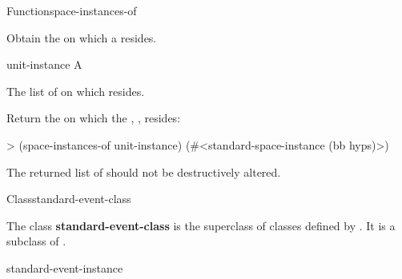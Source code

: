 \documentclass[10pt,twoside,english,pdftex]{article}
\begin{document}

\begin{functiondoc}{Function}{space-instances-of}%
  { \returns{} }
%
%

\fnsyntax

\fnpurpose Obtain the  on which a
 resides. 

\fnpackage {}

\fnmodule {}

\fnargs
\begin{args}{unit-instance}
 A 
\end{args}

\fnreturns The list of  on which
 resides.

\fnexample
Return the  on which the ,
, resides:
\begin{example}
> (space-instances-of unit-instance)
(#<standard-space-instance (bb hyps)>)
\end{example}

\fnnotes The returned list of  should not be
destructively altered.

\end{functiondoc}


\begin{functiondoc}{Class}{standard-event-class}{}
%

\fnsyntax

\fnpackage {}

\fnmodule {}

\fndescription 
{}%
The class \textbf{standard-event-class} is the superclass of classes defined
by \textbf{}.  It is a subclass of
.

\begin{alsos}{standard-event-instance}
\end{alsos}

\end{functiondoc}
\end{document}
